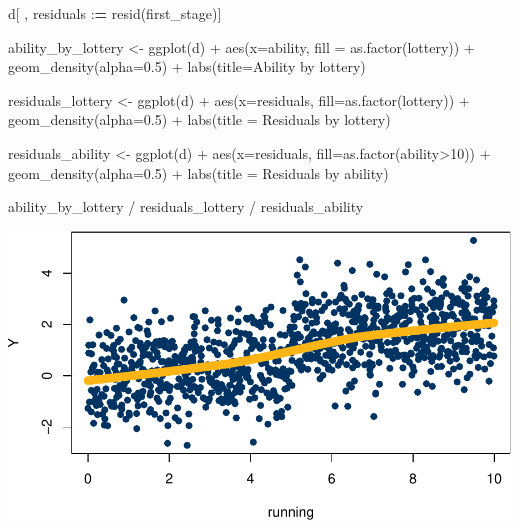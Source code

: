 \documentclass[
]{article}
\newenvironment{Shaded}{\begin{snugshade}}{\end{snugshade}}
\newcommand{\AttributeTok}[1]{\textcolor[rgb]{0.77,0.63,0.00}{#1}}
\newcommand{\DecValTok}[1]{\textcolor[rgb]{0.00,0.00,0.81}{#1}}
\newcommand{\ErrorTok}[1]{\textcolor[rgb]{0.64,0.00,0.00}{\textbf{#1}}}
\newcommand{\FloatTok}[1]{\textcolor[rgb]{0.00,0.00,0.81}{#1}}
\newcommand{\FunctionTok}[1]{\textcolor[rgb]{0.00,0.00,0.00}{#1}}
\newcommand{\NormalTok}[1]{#1}
\newcommand{\OtherTok}[1]{\textcolor[rgb]{0.56,0.35,0.01}{#1}}
\newcommand{\SpecialCharTok}[1]{\textcolor[rgb]{0.00,0.00,0.00}{#1}}
\newcommand{\StringTok}[1]{\textcolor[rgb]{0.31,0.60,0.02}{#1}}
\begin{document}
\begin{Shaded}
\begin{Highlighting}[]
\NormalTok{d[ , residuals }\SpecialCharTok{:}\ErrorTok{=} \FunctionTok{resid}\NormalTok{(first\_stage)]}

\NormalTok{ability\_by\_lottery }\OtherTok{\textless{}{-}} \FunctionTok{ggplot}\NormalTok{(d) }\SpecialCharTok{+} 
  \FunctionTok{aes}\NormalTok{(}\AttributeTok{x=}\NormalTok{ability, }\AttributeTok{fill =} \FunctionTok{as.factor}\NormalTok{(lottery)) }\SpecialCharTok{+} 
  \FunctionTok{geom\_density}\NormalTok{(}\AttributeTok{alpha=}\FloatTok{0.5}\NormalTok{) }\SpecialCharTok{+} 
  \FunctionTok{labs}\NormalTok{(}\AttributeTok{title=}\StringTok{\textquotesingle{}Ability by lottery\textquotesingle{}}\NormalTok{)}

\NormalTok{residuals\_lottery }\OtherTok{\textless{}{-}} \FunctionTok{ggplot}\NormalTok{(d) }\SpecialCharTok{+} 
  \FunctionTok{aes}\NormalTok{(}\AttributeTok{x=}\NormalTok{residuals, }\AttributeTok{fill=}\FunctionTok{as.factor}\NormalTok{(lottery)) }\SpecialCharTok{+} 
  \FunctionTok{geom\_density}\NormalTok{(}\AttributeTok{alpha=}\FloatTok{0.5}\NormalTok{) }\SpecialCharTok{+} 
  \FunctionTok{labs}\NormalTok{(}\AttributeTok{title =} \StringTok{\textquotesingle{}Residuals by lottery\textquotesingle{}}\NormalTok{)}

\NormalTok{residuals\_ability }\OtherTok{\textless{}{-}} \FunctionTok{ggplot}\NormalTok{(d) }\SpecialCharTok{+} 
  \FunctionTok{aes}\NormalTok{(}\AttributeTok{x=}\NormalTok{residuals, }\AttributeTok{fill=}\FunctionTok{as.factor}\NormalTok{(ability}\SpecialCharTok{\textgreater{}}\DecValTok{10}\NormalTok{)) }\SpecialCharTok{+} 
  \FunctionTok{geom\_density}\NormalTok{(}\AttributeTok{alpha=}\FloatTok{0.5}\NormalTok{) }\SpecialCharTok{+} 
  \FunctionTok{labs}\NormalTok{(}\AttributeTok{title =} \StringTok{\textquotesingle{}Residuals by ability\textquotesingle{}}\NormalTok{)}

\NormalTok{ability\_by\_lottery }\SpecialCharTok{/}\NormalTok{ residuals\_lottery }\SpecialCharTok{/}\NormalTok{ residuals\_ability}
\end{Highlighting}
\end{Shaded}

\includegraphics{241-live-session_files/figure-latex/unnamed-chunk-21-1.pdf}
\end{document}
